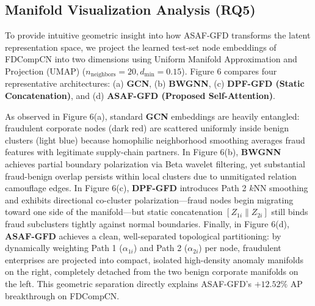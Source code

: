 \documentclass[10pt,a4paper,twocolumn]{article}
\begin{document}
\subsection{Manifold Visualization Analysis (RQ5)}

To provide intuitive geometric insight into how ASAF-GFD transforms the latent representation space, we project the learned test-set node embeddings of FDCompCN into two dimensions using Uniform Manifold Approximation and Projection (UMAP) \cite{ref52} ($n_{\text{neighbors}} = 20, d_{\min} = 0.15$). Figure 6 compares four representative architectures: (a) \textbf{GCN}, (b) \textbf{BWGNN}, (c) \textbf{DPF-GFD (Static Concatenation)}, and (d) \textbf{ASAF-GFD (Proposed Self-Attention)}.

As observed in Figure 6(a), standard \textbf{GCN} embeddings are heavily entangled: fraudulent corporate nodes (dark red) are scattered uniformly inside benign clusters (light blue) because homophilic neighborhood smoothing averages fraud features with legitimate supply-chain partners. In Figure 6(b), \textbf{BWGNN} achieves partial boundary polarization via Beta wavelet filtering, yet substantial fraud-benign overlap persists within local clusters due to unmitigated relation camouflage edges. In Figure 6(c), \textbf{DPF-GFD} introduces Path 2 $k$NN smoothing and exhibits directional co-cluster polarization---fraud nodes begin migrating toward one side of the manifold---but static concatenation $[Z_{1i} \parallel Z_{2i}]$ still binds fraud subclusters tightly against normal boundaries. Finally, in Figure 6(d), \textbf{ASAF-GFD} achieves a clean, well-separated topological partitioning: by dynamically weighting Path 1 ($\alpha_{1i}$) and Path 2 ($\alpha_{2i}$) per node, fraudulent enterprises are projected into compact, isolated high-density anomaly manifolds on the right, completely detached from the two benign corporate manifolds on the left. This geometric separation directly explains ASAF-GFD's $+12.52\%$ AP breakthrough on FDCompCN.
\end{document}
